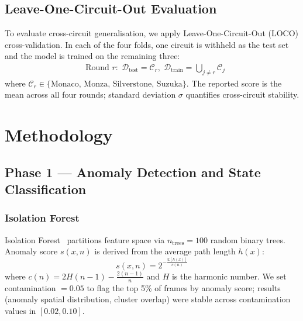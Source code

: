 \documentclass[conference,a4paper]{IEEEtran}
\begin{document}
\subsection{Leave-One-Circuit-Out Evaluation}

To evaluate cross-circuit generalisation, we apply Leave-One-Circuit-Out (LOCO)
cross-validation.
In each of the four folds, one circuit is withheld as the test set and the model is
trained on the remaining three:
\begin{align}
  &\text{Round } r: \; \mathcal{D}_{\text{test}} = \mathcal{C}_r, \;
  \mathcal{D}_{\text{train}} = \bigcup_{j \neq r} \mathcal{C}_j
  \label{eq:loco}
\end{align}
where $\mathcal{C}_r \in \{\text{Monaco, Monza, Silverstone, Suzuka}\}$.
The reported score is the mean across all four rounds;
standard deviation $\sigma$ quantifies cross-circuit stability.


\section{Methodology}

\subsection{Phase 1 — Anomaly Detection and State Classification}

\subsubsection{Isolation Forest}
Isolation Forest~\cite{ref_iforest} partitions feature space via $n_{\text{trees}} = 100$
random binary trees.
Anomaly score $s(x, n)$ is derived from the average path length $h(x)$:
\begin{equation}
  s(x, n) = 2^{-\tfrac{\mathbb{E}[h(x)]}{c(n)}}
\end{equation}
where $c(n) = 2H(n-1) - \frac{2(n-1)}{n}$ and $H$ is the harmonic number.
We set contamination $= 0.05$ to flag the top 5\% of frames by anomaly score;
results (anomaly spatial distribution, cluster overlap) were stable across
contamination values in $[0.02, 0.10]$.
\end{document}
